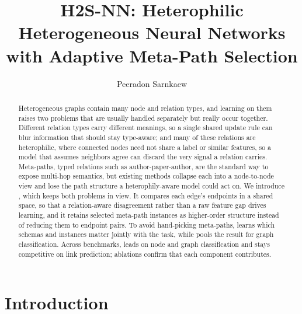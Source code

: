 \title[H2S-NN]{H2S-NN: Heterophilic Heterogeneous Neural Networks with Adaptive Meta-Path Selection}

\author{Peeradon Sarnkaew}
\renewcommand{\shortauthors}{Sarnkaew}



\begin{abstract}
Heterogeneous graphs contain many node and relation types, and learning on them raises two problems that are usually handled separately but really occur together. Different relation types carry different meanings, so a single shared update rule can blur information that should stay type-aware; and many of these relations are heterophilic, where connected nodes need not share a label or similar features, so a model that assumes neighbors agree can discard the very signal a relation carries. Meta-paths, typed relations such as author-paper-author, are the standard way to expose multi-hop semantics, but existing methods collapse each into a node-to-node view and lose the path structure a heterophily-aware model could act on. We introduce \method{}, which keeps both problems in view. It compares each edge's endpoints in a shared space, so that a relation-aware disagreement rather than a raw feature gap drives learning, and it retains selected meta-path instances as higher-order structure instead of reducing them to endpoint pairs. To avoid hand-picking meta-paths, \ampss{} learns which schemas and instances matter jointly with the task, while \sheafcovpool{} pools the result for graph classification. Across benchmarks, \method{} leads on node and graph classification and stays competitive on link prediction; ablations confirm that each component contributes.
\end{abstract}



\maketitle

\section{Introduction}
\label{sec:introduction}


